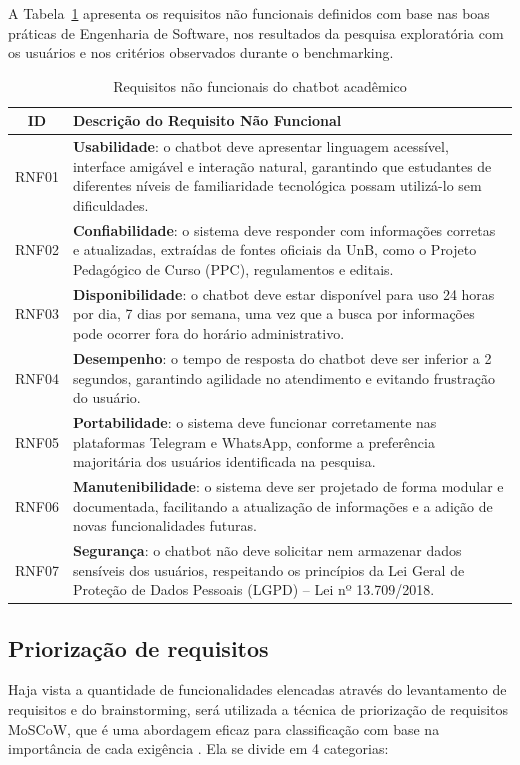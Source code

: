 A Tabela~\ref{tab:requisitos_nao_funcionais} apresenta os requisitos não funcionais definidos com base nas boas práticas de Engenharia de Software, nos resultados da pesquisa exploratória com os usuários e nos critérios observados durante o benchmarking.

\begin{table}[H]
\caption{Requisitos não funcionais do chatbot acadêmico}
\label{tab:requisitos_nao_funcionais}
\centering
\begin{tabular}{|c|p{12cm}|}
\hline
\textbf{ID} & \textbf{Descrição do Requisito Não Funcional} \\
\hline
RNF01 & \textbf{Usabilidade}: o chatbot deve apresentar linguagem acessível, interface amigável e interação natural, garantindo que estudantes de diferentes níveis de familiaridade tecnológica possam utilizá-lo sem dificuldades. \\
\hline
RNF02 & \textbf{Confiabilidade}: o sistema deve responder com informações corretas e atualizadas, extraídas de fontes oficiais da UnB, como o Projeto Pedagógico de Curso (PPC), regulamentos e editais. \\
\hline
RNF03 & \textbf{Disponibilidade}: o chatbot deve estar disponível para uso 24 horas por dia, 7 dias por semana, uma vez que a busca por informações pode ocorrer fora do horário administrativo. \\
\hline
RNF04 & \textbf{Desempenho}: o tempo de resposta do chatbot deve ser inferior a 2 segundos, garantindo agilidade no atendimento e evitando frustração do usuário. \\
\hline
RNF05 & \textbf{Portabilidade}: o sistema deve funcionar corretamente nas plataformas Telegram e WhatsApp, conforme a preferência majoritária dos usuários identificada na pesquisa. \\
\hline
RNF06 & \textbf{Manutenibilidade}: o sistema deve ser projetado de forma modular e documentada, facilitando a atualização de informações e a adição de novas funcionalidades futuras. \\
\hline
RNF07 & \textbf{Segurança}: o chatbot não deve solicitar nem armazenar dados sensíveis dos usuários, respeitando os princípios da Lei Geral de Proteção de Dados Pessoais (LGPD) – Lei nº 13.709/2018. \\
\hline
\end{tabular}
\end{table}

\subsection{Priorização de requisitos}
Haja vista a quantidade de funcionalidades elencadas através do levantamento de requisitos e do brainstorming, será utilizada a técnica de priorização de requisitos MoSCoW, que é uma abordagem eficaz para classificação com base na importância de cada exigência \cite{cottrell1999}. Ela se divide em 4 categorias:

